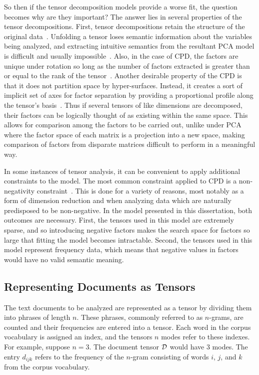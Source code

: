 \documentclass[../ut-dissertation.tex]{subfiles}
\begin{document}
So then if the tensor decomposition models provide a worse fit, the
question becomes why are they important?  The answer lies in several
properties of the tensor decompositions.  First, tensor decompositions
retain the structure of the original data~\cite{harshman1970,
  kolda2009}.  Unfolding a tensor loses semantic information about the
variables being analyzed, and extracting intuitive semantics from the
resultant PCA model is difficult and usually
impossible~\cite{bro1997}.  Also, in the case of CPD, the factors are
unique under rotation so long as the number of factors extracted is
greater than or equal to the rank of the tensor~\cite{harshman1994}.
Another desirable property of the CPD is that it does not partition
space by hyper-surfaces.  Instead, it creates a sort of implicit set
of axes for factor separation by providing a proportional profile
along the tensor's basis~\cite{harshman1994}.  Thus if several tensors
of like dimensions are decomposed, their factors can be logically
thought of as existing within the same space.  This allows for
comparison among the factors to be carried out, unlike under PCA where
the factor space of each matrix is a projection into a new space,
making comparison of factors from disparate matrices difficult to
perform in a meaningful way.

In some instances of tensor analysis, it can be convenient to apply
additional constraints to the model.  The most common constraint
applied to CPD is a non-negativity constraint~\cite{liu2012sparse,
  bro1997, kolda2009}.  This is done for a variety of reasons, most
notably as a form of dimension reduction and when analyzing data which
are naturally predisposed to be non-negative.  In the model presented
in this dissertation, both outcomes are necessary.  First, the tensors
used in this model are extremely sparse, and so introducing negative
factors makes the search space for factors so large that fitting the
model becomes intractable.  Second, the tensors used in this model
represent frequency data, which means that negative values in factors
would have no valid semantic meaning.

\subsection{Representing Documents as Tensors}
The text documents to be analyzed are represented as a tensor by
dividing them into phrases of length $n$.  These phrases, commonly
referred to as $n$-grams, are counted and their frequencies are
entered into a tensor.  Each word in the corpus vocabulary is assigned
an index, and the tensors $n$ modes refer to these indexes.  For
example, suppose $n=3$.  The document tensor $\mathcal{D}$ would have
3 modes.  The entry $d_{ijk}$ refers to the frequency of the
$n$-gram consisting of words $i$, $j$, and $k$ from the corpus
vocabulary.  
\end{document}
